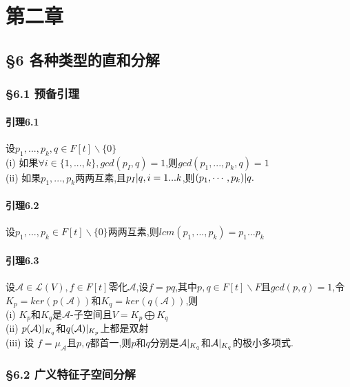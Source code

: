 \documentclass{ctexart}
\begin{document}
\section{第二章}
\fi


\subsection{§6 各种类型的直和分解}

\subsubsection{§6.1 预备引理}

\paragraph{引理6.1}
设$p_{1},...,p_{k},q \in F[t]\backslash \{0\}$\\
(i) 如果$\forall i \in \{1,...,k\},gcd(p_{I},q) = 1$,则$gcd(p_{1},...,p_{k},q) = 1$\\
(ii) 如果$p_{1},...,p_{k}$两两互素,且$p_{I}\arrowvert q, i=1...k$,则$(p_{1},\cdots ,p_{k}) \arrowvert q.$\\

\paragraph{引理6.2}
设$p_{1},...,p_{k} \in F[t] \backslash \{0\}$两两互素,则$lcm(p_{1},...,p_{k}) = p_{1}...p_{k}$

\paragraph{引理6.3}
设$\mathcal{A} \in \mathcal{L}(V),f\in F[t]$零化$\mathcal{A}$,设$f=pq$,其中$p,q\in F[t] \backslash F$且$gcd(p,q) = 1$,令$K_{p}=ker(p(\mathcal{A}))$和$K_{q}=ker(q(\mathcal{A}))$,则\\
(i) $K_{p}$和$K_{q}$是$\mathcal{A}$-子空间且$V=K_{p}\bigoplus K_{q}$\\
(ii) $p(\mathcal{A})\arrowvert_{K_{q}}$和$q(\mathcal{A})\arrowvert_{K_{p}}$上都是双射\\
(iii) 设 $f=\mu_{\mathcal{A}}$且$p,q$都首一,则$p$和$q$分别是$\mathcal{A}\arrowvert_{K_{q}}$和$\mathcal{A}\arrowvert_{K_{q}}$的极小多项式.

\subsubsection{§6.2 广义特征子空间分解}
\end{document}
